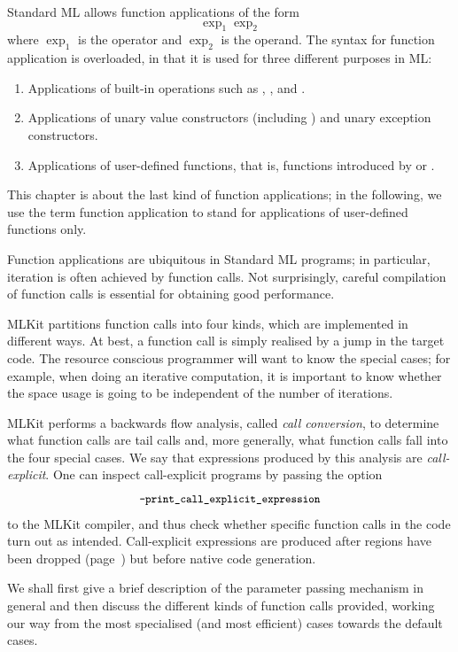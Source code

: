 \documentclass[12pt]{book}
\begin{document}
Standard ML allows function applications of the form
$$\exp_1 \exp_2$$ where $\exp_1$ is the operator and $\exp_2$ is the operand.
The syntax for function application is overloaded, in that it is used for three
different purposes in ML:
\begin{enumerate}
\item Applications of built-in operations such as \kw{+},
  \kw{=}, and \kw{:=}.
\item Applications of unary value constructors (including ) and unary
  exception constructors.
\item Applications of user-defined functions, that is, functions introduced by
   or .
\end{enumerate}
This chapter is about the last kind of function applications; in the following,
we use the term function application to stand for applications of user-defined
functions only.

Function applications are ubiquitous in Standard ML programs; in particular,
iteration is often achieved by function calls. Not surprisingly, careful
compilation of function calls is essential for obtaining good performance.

MLKit partitions function calls into four kinds, which are implemented in
different ways.  At best, a function call is simply realised by a jump in the
target code.  The resource conscious programmer will want to know the special
cases; for example, when doing an iterative computation, it is important to know
whether the space usage is going to be independent of the number of iterations.

MLKit performs a backwards flow analysis, called
%
%
%
{\em call conversion}, to determine what function calls are tail calls and, more
generally, what function calls fall into the four special cases. We say that
expressions produced by this analysis are
%
%
\label{call-explicit}%
%
{\em call-explicit}. One can inspect call-explicit programs by
passing the option
%
%
%
$$\mbox{\small\ttfamily-print\_call\_explicit\_expression}$$ to the MLKit compiler, and thus
check whether specific function calls in the code turn out as intended.
Call-explicit expressions are produced after regions have been dropped
(page~\pageref{bother-to-distinguish-get-n-put}) but before native code
generation.

We shall first give a brief description of the parameter passing mechanism in
general and then discuss the different kinds of function calls provided, working
our way from the most specialised (and most efficient) cases towards the default
cases.
\end{document}
